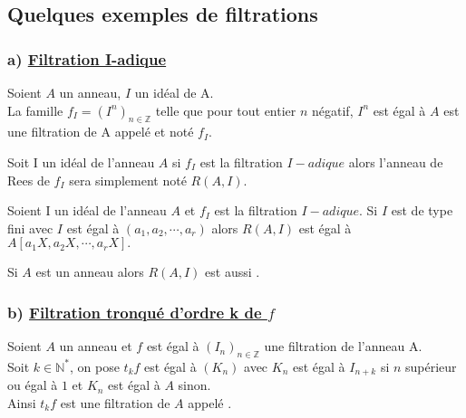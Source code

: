 \subsection{Quelques exemples de filtrations}
\subsubsection{a) \underline{Filtration I-adique}}
\begin{madefinition}
	Soient $A$ un anneau, $I$ un idéal de A.\\
	La famille $f_I = (I^n)_{n\in \mathbb{Z}}$ telle que pour tout  entier $n$ négatif, $I^n $ est égal à $  A$ est une filtration de A appelé  et noté $f_I.$
\end{madefinition}
\begin{maremarque}
	Soit I un idéal de l'anneau $A$ si $f_I$ est la filtration $I-adique$ alors l'anneau de Rees de $f_I$ sera simplement noté $R(A,I)$.
\end{maremarque}
\begin{maproposition}
	Soient I un idéal de l'anneau $A$ et $f_I$ est la filtration $I-adique$.
	Si $I$ est de type fini avec $I $ est égal à $  (a_1, a_2, \cdots, a_r)$ alors $R(A,I) $ est égal à $  A[a_1X,a_2X, \cdots, a_rX].$
\end{maproposition}
\begin{maconsequence}
	Si $A$ est un anneau  alors $R(A,I)$ est aussi .
\end{maconsequence}


\subsubsection{b) \underline{Filtration tronqué d'ordre k de $f$}}
\begin{madefinition}
	Soient $A$ un anneau et $f $ est égal à $  (I_n)_{n\in \mathbb{Z}}$ une filtration de l'anneau A.\\
	Soit $k \in \mathbb{N}^{*}$, on pose $t_{k}f$ est égal à $ (K_n)$ avec $K_n $ est égal à $ I_{n+k}$ si $n $ supérieur ou égal à $ 1 $ et $K_n $ est égal à $ A$ sinon.\\
	Ainsi $t_{k}f$ est une filtration de $A$ appelé .
\end{madefinition}

